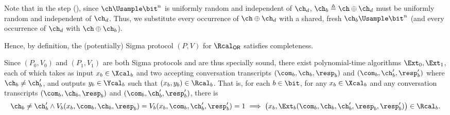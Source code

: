 \begin{answer}
    Note that in the step (), since $\ch\Usample\bit^n$ is uniformly random and independent of $\ch_d$, $\ch_b\triangleq \ch\oplus \ch_d$ must be uniformly random and independent of $\ch_d$. Thus, we substitute every occurrence of $\ch\oplus \ch_d$ with a shared, fresh $\ch_b\Usample \bit^n$ (and every occurrence of $\ch_d$ with $\ch\oplus \ch_b$). 

    Hence, by definition, the (potentially) Sigma protocol $(P, V)$ for $\Rcal_\mathsf{OR}$ satisfies completeness.
    

    Since $(P_0, V_0)$ and $(P_1, V_1)$ are both Sigma protocols and are thus specially sound, there exist polynomial-time algorithms $\Ext_0, \Ext_1$, each of which takes as input $x_b\in\Xcal_b$ and two accepting conversation transcripts $(\com_b, \ch_b, \resp_b)$ and $(\com_b, \ch_b', \resp_b')$ where $\ch_b\neq \ch_b'$, and outputs $y_b\in \Ycal_b$ such that $(x_b, y_b)\in\Rcal_b$. That is, for each $b\in\bit$, for any $x_b\in\Xcal_b$ and any conversation transcripts $(\com_b, \ch_b, \resp_b)$ and $(\com_b, \ch_b', \resp_b')$, there is 
    \begin{equation}\label{eq:p5-2-1}
        \ch_b\neq \ch_b' \land V_b(x_b, \com_b, \ch_b, \resp_b)=V_b(x_b, \com_b, \ch_b', \resp_b')=1
        \implies \left(x_b, \Ext_b(\com_b, \ch_b, \ch_b', \resp_b, \resp_b')\right) \in \Rcal_b.
    \end{equation}


\end{answer}
